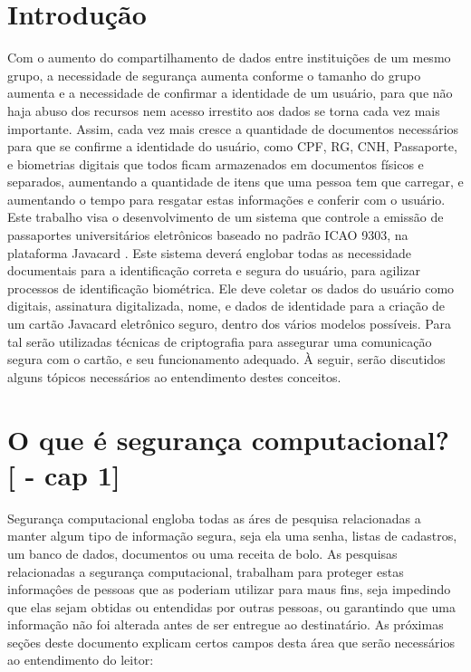 \documentclass{article}
\begin{document}
	\section{Introdução}
		\begin{flushleft}
			
			\hspace{2cm}Com o aumento do compartilhamento de dados entre instituições de um mesmo grupo, a necessidade de segurança aumenta conforme o tamanho do grupo aumenta e a necessidade de confirmar a identidade de um usuário, para que não haja abuso dos recursos nem acesso irrestito aos dados se torna cada vez mais importante. Assim, cada vez mais cresce a quantidade de documentos necessários para que se confirme a identidade do usuário, como CPF, RG, CNH, Passaporte, e biometrias digitais que todos ficam armazenados em documentos físicos e separados, aumentando a quantidade de itens que uma pessoa tem que carregar, e aumentando o tempo para resgatar estas informações e conferir com o usuário. \\
			\hspace{2cm} Este trabalho visa o desenvolvimento de um sistema que controle a emissão de passaportes universitários eletrônicos baseado no padrão ICAO 9303, na plataforma Javacard \cite{JAVACHEN}. Este sistema deverá englobar todas as necessidade documentais para a identificação correta e segura do usuário, para agilizar processos de identificação biométrica. Ele deve coletar os dados do usuário como digitais, assinatura digitalizada, nome, e dados de identidade para a criação de um cartão Javacard eletrônico seguro, dentro dos vários modelos possíveis. Para tal serão utilizadas técnicas de criptografia para assegurar uma comunicação segura com o cartão, e seu funcionamento adequado. À seguir, serão discutidos alguns tópicos necessários ao entendimento destes conceitos.

			
		\end{flushleft}

	\section{O que é segurança computacional? [\cite{STALLINS} - cap 1]}
		\begin{flushleft}
			
			\hspace{2cm} Segurança computacional engloba todas as áres de pesquisa relacionadas a manter algum tipo de informação segura, seja ela uma senha, listas de cadastros, um banco de dados, documentos ou uma receita de bolo. As pesquisas relacionadas a segurança computacional, trabalham para proteger estas informaçôes de pessoas que as poderiam utilizar para maus fins, seja impedindo que elas sejam obtidas ou entendidas por outras pessoas, ou garantindo que uma informação não foi alterada antes de ser entregue ao destinatário. As próximas seções deste documento explicam certos campos desta área que serão necessários ao entendimento do leitor:
			
		\end{flushleft}
\end{document}
